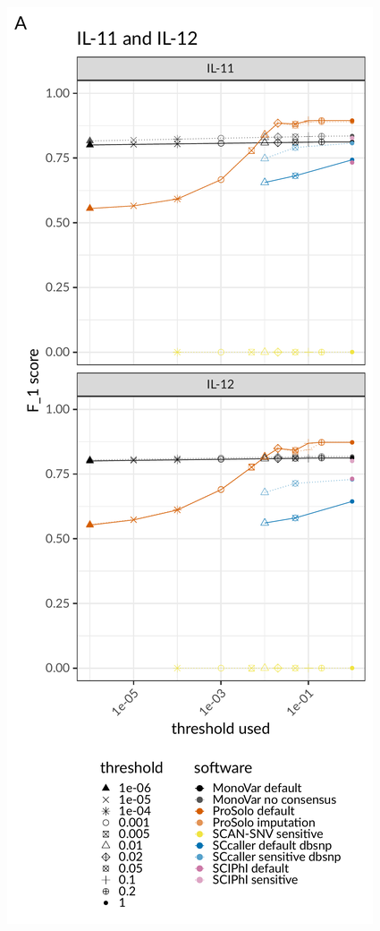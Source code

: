 \documentclass[authoryear,preprint,11pt]{scrartcl}
\begin{document}
\begin{figure}[!tpb]
 \begin{minipage}[t]{.35\linewidth}
 \vspace{0pt}
  \includegraphics[width=\linewidth]{figs/Dong2017/Dong2017_prosolo-monovar-scansnv-sccaller_F1_plot.pdf} \newline

\end{minipage}
\end{figure}
\end{document}
